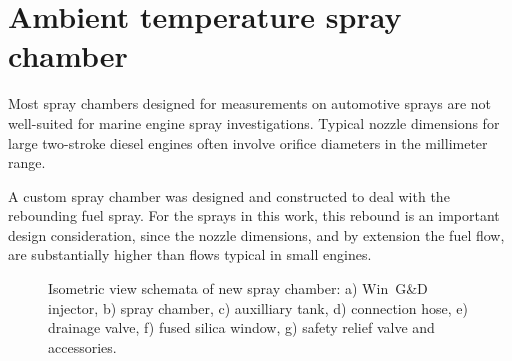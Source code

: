 \documentclass[letterpaper,twocolumn,10pt]{ilass}
\begin{document}
\section*{Ambient temperature spray chamber}
Most spray chambers designed for measurements on automotive sprays are not well-suited for
marine engine spray investigations.
Typical nozzle dimensions for large two-stroke diesel engines often involve orifice diameters in the millimeter range.
%

A custom spray chamber was designed and constructed to deal with the rebounding fuel spray.
For the sprays in this work, this rebound is an important design consideration, since the nozzle dimensions, and by extension the fuel flow, are substantially higher than flows typical in small engines. 

\begin{figure}[h]
\begin{center}
\end{center} 
\vspace*{-5mm}
\caption{Isometric view schemata of new spray chamber:
         a) Win~G\&D injector,
				 b) spray chamber,
				 c) auxilliary tank,
				 d) connection hose,
				 e) drainage valve,
				 f) fused silica window,
				 g) safety relief valve and accessories.}
\label{fig1} 
\end{figure}
\end{document}
